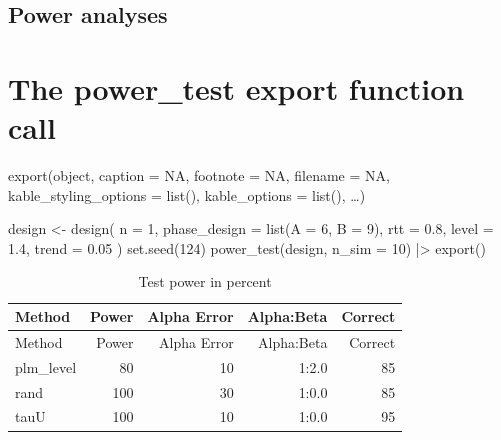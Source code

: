 \documentclass[
  letterpaper,
  DIV=11,
  numbers=noendperiod]{scrreprt}
\newenvironment{Shaded}{\begin{snugshade}}{\end{snugshade}}
\newcommand{\AttributeTok}[1]{\textcolor[rgb]{0.40,0.45,0.13}{#1}}
\newcommand{\DecValTok}[1]{\textcolor[rgb]{0.68,0.00,0.00}{#1}}
\newcommand{\FloatTok}[1]{\textcolor[rgb]{0.68,0.00,0.00}{#1}}
\newcommand{\FunctionTok}[1]{\textcolor[rgb]{0.28,0.35,0.67}{#1}}
\newcommand{\NormalTok}[1]{\textcolor[rgb]{0.00,0.23,0.31}{#1}}
\newcommand{\OtherTok}[1]{\textcolor[rgb]{0.00,0.23,0.31}{#1}}
\newcommand{\SpecialCharTok}[1]{\textcolor[rgb]{0.37,0.37,0.37}{#1}}
\begin{document}
\hypertarget{power-analyses}{%
\section{Power analyses}\label{power-analyses}}

\begin{tcolorbox}[enhanced jigsaw, breakable, rightrule=.15mm, bottomrule=.15mm, arc=.35mm, colback=white, colframe=quarto-callout-tip-color-frame, opacityback=0, leftrule=.75mm, toprule=.15mm, left=2mm]
\begin{minipage}[t]{5.5mm}
\textcolor{quarto-callout-tip-color}{\faLightbulb}
\end{minipage}%
\begin{minipage}[t]{\textwidth - 5.5mm}


\hypertarget{the-power_test-export-function-call}{%
\chapter{The power\_test export function
call}\label{the-power_test-export-function-call}}

export(object, caption = NA, footnote = NA, filename = NA,
kable\_styling\_options = list(), kable\_options = list(), \ldots)

\end{minipage}%
\end{tcolorbox}

\begin{Shaded}
\begin{Highlighting}[]
\NormalTok{design }\OtherTok{\textless{}{-}} \FunctionTok{design}\NormalTok{(}
  \AttributeTok{n =} \DecValTok{1}\NormalTok{, }\AttributeTok{phase\_design =} \FunctionTok{list}\NormalTok{(}\AttributeTok{A =} \DecValTok{6}\NormalTok{, }\AttributeTok{B =} \DecValTok{9}\NormalTok{),}
  \AttributeTok{rtt =} \FloatTok{0.8}\NormalTok{, }\AttributeTok{level =} \FloatTok{1.4}\NormalTok{, }\AttributeTok{trend =} \FloatTok{0.05}
\NormalTok{)}
\FunctionTok{set.seed}\NormalTok{(}\DecValTok{124}\NormalTok{)}
\FunctionTok{power\_test}\NormalTok{(design, }\AttributeTok{n\_sim =} \DecValTok{10}\NormalTok{) }\SpecialCharTok{|\textgreater{}} \FunctionTok{export}\NormalTok{()}
\end{Highlighting}
\end{Shaded}

\begin{longtable}[]{@{}lrrrr@{}}
\caption{Test power in percent}\tabularnewline
\toprule()
Method & Power & Alpha Error & Alpha:Beta & Correct \\
\midrule()
\endfirsthead
\toprule()
Method & Power & Alpha Error & Alpha:Beta & Correct \\
\midrule()
\endhead
plm\_level & 80 & 10 & 1:2.0 & 85 \\
rand & 100 & 30 & 1:0.0 & 85 \\
tauU & 100 & 10 & 1:0.0 & 95 \\
\bottomrule()
\end{longtable}
\end{document}
